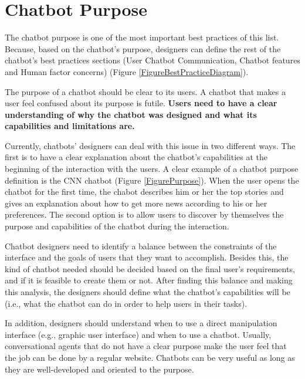 \documentclass[a4paper,10pt]{article}
\begin{document}
\section{Chatbot Purpose}

The chatbot purpose is one of the most important best practices of this list. Because, based on the chatbot's purpose, designers can define the rest of the chatbot's best practices sections (User Chatbot Communication, Chatbot features and Human factor concerns) (Figure \ref{FigureBestPracticeDiagram}).

The purpose of a chatbot should be clear to its users. A chatbot that makes a user feel confused about its purpose is futile. \textbf{Users need to have a clear understanding of why the chatbot was designed and what its capabilities and limitations are.}

Currently, chatbots' designers can deal with this issue in two different ways. The first is to have a clear explanation about the chatbot's capabilities at the beginning of the interaction with the users. A clear example of a chatbot purpose definition is the CNN chatbot (Figure \ref{FigurePurpose}). When the user opens the chatbot for the first time, the chabot describes him or her the top stories and gives an explanation about how to get more news according to his or her preferences. The second option is to allow users to discover by themselves the purpose and capabilities of the chatbot during the interaction.

Chatbot designers need to identify a balance between the constraints of the interface and the goals of users that they want to accomplish. Besides this, the kind of chatbot needed should be decided based on the final user's requirements, and if it is feasible to create them or not. After finding this balance and making this analysis, the designers should define what the chatbot's capabilities will be (i.e., what the chatbot can do in order to help users in their tasks). 

In addition, designers should understand when to use a direct manipulation interface (e.g., graphic user interface) and when to use a chatbot. Usually, conversational agents that do not have a clear purpose make the user feel that the job can be done by a regular website. Chatbots can be very useful as long as they are well-developed and oriented to the purpose.  

\end{document}
